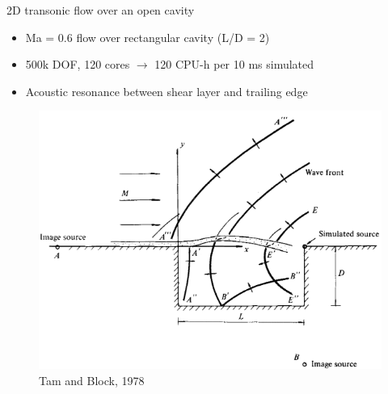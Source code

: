\documentclass[]{beamer}
\begin{document}
\begin{frame}{2D transonic flow over an open cavity}
    \begin{itemize}
		\item Ma = 0.6 flow over rectangular cavity (L/D = 2)
		\item 500k DOF, 120 cores $\rightarrow$ 120 CPU-h per 10 ms simulated 
		\item Acoustic resonance between shear layer and trailing edge
	\end{itemize}
	\begin{figure}
		\begin{minipage}{0.4\linewidth}
			\vspace{1em}
				\includegraphics[width=0.99\linewidth]{experiments/2d_cavity/tamAndBlockCavity.png}
				\caption*{\tiny{Tam and Block, 1978}}
		\end{minipage}
		\begin{minipage}{0.59\linewidth}
		\end{minipage}
	\end{figure}
\end{frame}
\end{document}
